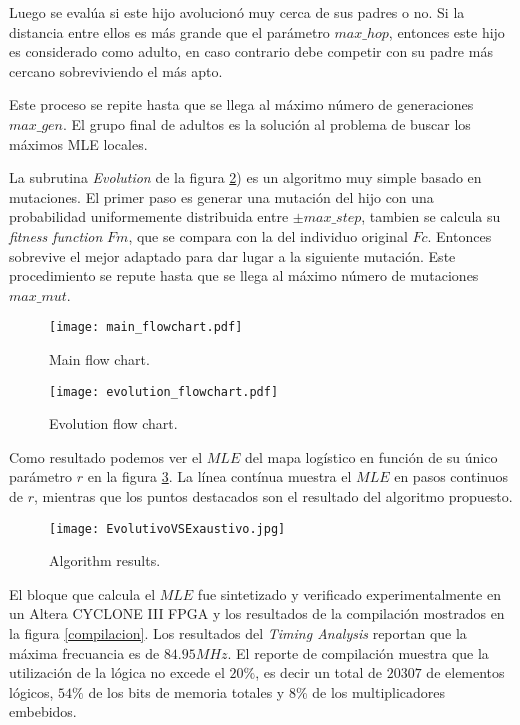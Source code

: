 Luego se evalúa si este hijo avolucionó muy cerca de sus padres o no.
Si la distancia entre ellos es más grande que el parámetro $max\_hop$, entonces este hijo es considerado como adulto, en caso contrario debe competir con su padre más cercano sobreviviendo el más apto.

Este proceso se repite hasta que se llega al máximo número de  generaciones $max\_gen$.
El grupo final de adultos es la solución al problema de buscar los máximos MLE locales.

La subrutina \textit{Evolution} de la figura \ref{diagramaflujo2}) es un algoritmo muy simple basado en mutaciones.
El primer paso es generar una mutación del hijo con una probabilidad uniformemente distribuida entre $\pm max\_step$, tambien se calcula su \textit{fitness function} $Fm$, que se compara con la del individuo original $Fc$.
Entonces sobrevive el mejor adaptado para dar lugar a la siguiente mutación.
Este procedimiento se repute hasta que se llega al máximo número de mutaciones $max\_mut$.

\begin{figure}
	\centering
	\texttt{[image: main\_flowchart.pdf]}\\
	\caption{Main flow chart.}\label{diagramaflujo1}
\end{figure}

\begin{figure}
	\centering
	\texttt{[image: evolution\_flowchart.pdf]}\\
	\caption{Evolution flow chart.}\label{diagramaflujo2}
\end{figure}

Como resultado podemos ver el $MLE$ del mapa logístico en función de su único parámetro $r$ en la figura \ref{resultadoAlgorithm}.
La línea contínua muestra el $MLE$ en pasos continuos de $r$, mientras que los puntos destacados son el resultado del algoritmo propuesto.

\begin{figure}
	\centering
	\texttt{[image: EvolutivoVSExaustivo.jpg]}\\
	\caption{Algorithm results.}\label{resultadoAlgorithm}
\end{figure}

El bloque que calcula el $MLE$ fue sintetizado y verificado experimentalmente en un Altera CYCLONE III FPGA y los resultados de la compilación mostrados en la figura \ref{compilacion}.
Los resultados del \textit{Timing Analysis} reportan que la máxima frecuancia es de $84.95MHz$.
El reporte de compilación muestra que la utilización de la lógica no excede el $20\%$, es decir un total de $20307$ de elementos lógicos, $54\%$ de los bits de memoria totales y $8\%$ de los multiplicadores embebidos.

